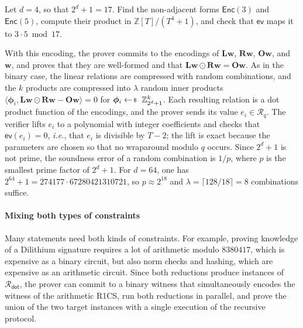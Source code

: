 \documentclass[../../book.tex]{subfiles}
\begin{document}
\begin{exercise}\label{exercise:labrador-ev}
    Let $d = 4$, so that $2^d + 1 = 17$.
    Find the non-adjacent forms $\mathsf{Enc}(3)$ and $\mathsf{Enc}(5)$, compute their product in $\mathbb{Z}[T]/(T^4 + 1)$, and check that $\mathsf{ev}$ maps it to $3 \cdot 5 \bmod 17$.

\end{exercise}

With this encoding, the prover commits to the encodings of $\mathbf{L}\mathbf{w}$, $\mathbf{R}\mathbf{w}$, $\mathbf{O}\mathbf{w}$, and $\mathbf{w}$, and proves that they are well-formed and that $\mathbf{L}\mathbf{w} \odot \mathbf{R}\mathbf{w} = \mathbf{O}\mathbf{w}$.
As in the binary case, the linear relations are compressed with random combinations, and the $k$ products are compressed into $\lambda$ random inner products $\langle \boldsymbol{\phi}_i, \mathbf{L}\mathbf{w} \odot \mathbf{R}\mathbf{w} - \mathbf{O}\mathbf{w} \rangle = 0$ for $\boldsymbol{\phi}_i \leftarrowS \mathbb{Z}_{2^d+1}^k$.
Each resulting relation is a dot product function of the encodings, and the prover sends its value $e_i \in \mathcal{R}_q$.
The verifier lifts $e_i$ to a polynomial with integer coefficients and checks that $\mathsf{ev}(e_i) = 0$, \textit{i.e.}, that $e_i$ is divisible by $T - 2$; the lift is exact because the parameters are chosen so that no wraparound modulo $q$ occurs.
Since $2^d + 1$ is not prime, the soundness error of a random combination is $1/p$, where $p$ is the smallest prime factor of $2^d + 1$.
For $d = 64$, one has $2^{64} + 1 = 274177 \cdot 67280421310721$, so $p \approx 2^{18}$ and $\lambda = \lceil 128/18 \rceil = 8$ combinations suffice.

\paragraph{Mixing both types of constraints}
Many statements need both kinds of constraints.
For example, proving knowledge of a Dilithium signature requires a lot of arithmetic modulo $8380417$, which is expensive as a binary circuit, but also norm checks and hashing, which are expensive as an arithmetic circuit.
Since both reductions produce instances of $\mathcal{R}_{\mathsf{dot}}$, the prover can commit to a binary witness that simultaneously encodes the witness of the arithmetic R1CS, run both reductions in parallel, and prove the union of the two target instances with a single execution of the recursive protocol.
\fi
\end{document}
